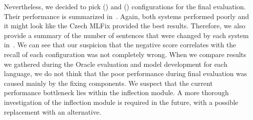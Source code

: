 \begin{table}[t]
\centering
\small
{}
\caption[Automatic evaluation of the German error detection module]{
    Automatic evaluation of the error detection module using different voting methods to interpret output
of multiple models using BLEU metric. Values are multiplied by 100 for easier reading,
and the relative improvement over the baseline MT output.
Performance of the
Oracle classifier is provided for comparison.
The best model for each dataset is printed in bold.
}
\label{markonly_de-summary}
\end{table}

Nevertheless, we decided to pick  () and  () configurations
for the final evaluation. Their performance is summarized in~. Again, both
systems performed poorly and it might look like the Czech MLFix provided the best results. Therefore,
we also provide a summary of the number of sentences that were changed by each system in~.
We can see that our suspicion that the negative score correlates with the recall of each configuration was not
completely wrong. When we compare results we gathered during the Oracle evaluation and model
development for each language, we do not think that the poor performance during final evaluation was
caused mainly by the fixing
components. We suspect that the current performance bottleneck lies within the inflection module.
A more thorough investigation of the inflection module is required in the future, with a possible
replacement with an alternative.

